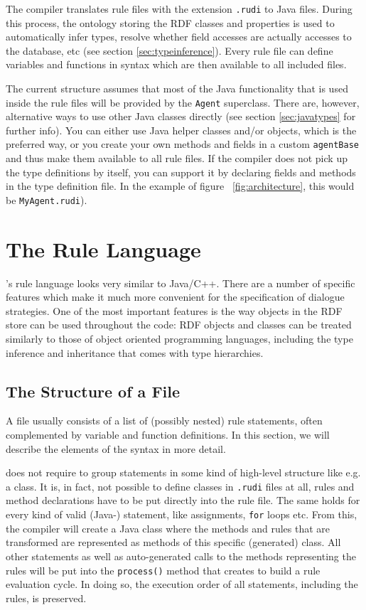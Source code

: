 The \vonda compiler translates rule files with the extension \texttt{.rudi} to
Java files. During this process, the ontology storing the RDF classes and
properties is used to automatically infer types, resolve whether field accesses
are actually accesses to the database, etc (see section
\ref{sec:typeinference}).
Every rule file can define variables and functions in \vonda syntax which are
then available to all included files.

The current structure assumes that most of the Java functionality that
is used inside the rule files will be provided by the \texttt{Agent}
superclass. There are, however, alternative ways to use other Java
classes directly (see section \ref{sec:javatypes} for further
info). You can either use Java helper classes and/or objects, which is
the preferred way, or you create your own methods and fields in a
custom \texttt{agentBase} and thus make them available to all rule
files. If the compiler does not pick up the type definitions by
itself, you can support it by declaring fields and methods in the type
definition file. In the example of figure ~\ref{fig:architecture},
this would be \texttt{MyAgent.rudi}).

\section{The \vonda Rule Language}
\label{sec:language}
\vonda's rule language looks very similar to Java/C++. There are a number of
specific features which make it much more convenient for the specification of
dialogue strategies. One of the most important features is the way objects in
the RDF store can be used throughout the code: RDF objects and classes can be
treated similarly to those of object oriented programming languages, including
the type inference and inheritance that comes with type hierarchies.

\subsection{The Structure of a \vonda File}

A \vonda file usually consists of a list of (possibly nested) rule statements,
often complemented by variable and function definitions. In this section, we
will describe the elements of the syntax in more detail.

\vonda does not require to group statements in some kind of high-level
structure like e.g. a class. It is, in fact, not possible to define classes in
\texttt{.rudi} files at all, rules and method declarations have to be put
directly into the rule file. The same holds for every kind of valid
(Java-) statement, like assignments, \texttt{for} loops etc. From this, the
compiler will create a Java class where the methods and rules that are
transformed are represented as methods of this specific (generated)
class. All other statements as well as auto-generated calls to the methods
representing the rules will be put into the \texttt{process()} method that
\vonda creates to build a rule evaluation cycle. In doing so, the execution
order of all statements, including the rules, is preserved.


